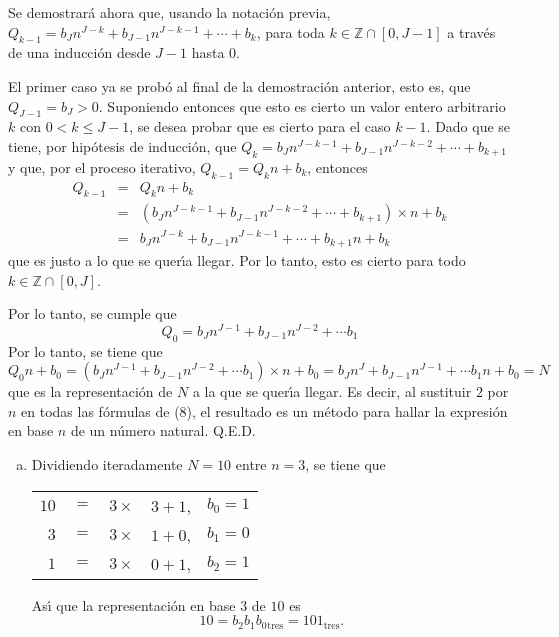 \begin{solucion}
 \par 
 Se demostrar\'a ahora que, usando la notaci\'on previa, $Q_{k-1} = b_{J}n^{J-k} + b_{J-1}n^{J-k-1} + \cdots + b_{k}$, para toda $k \in \mathbb{Z}\cap[0,J-1]$ a trav\'es de una inducci\'on desde $J-1$ hasta $0$.
 \par 
 El primer caso ya se prob\'o al final de la demostraci\'on anterior, esto es, que $Q_{J-1} = b_J > 0$. Suponiendo entonces que esto es cierto un valor entero arbitrario $k$ con $0 < k \leq J-1$, se desea probar que es cierto para el caso $k-1$.
 Dado que se tiene, por hip\'otesis de inducci\'on, que $Q_{k} = b_{J}n^{J-k-1} + b_{J-1}n^{J-k-2} + \cdots + b_{k+1}$ y que, por el proceso iterativo, $Q_{k-1} = Q_{k}n + b_{k}$, entonces 
 \begin{eqnarray*}
  Q_{k-1} & = & Q_{k}n + b_{k} \\
  & = & \left( b_{J}n^{J-k-1} + b_{J-1}n^{J-k-2} + \cdots + b_{k+1} \right) \times n + b_{k} \\
  & = & b_{J}n^{J-k} + b_{J-1}n^{J-k-1} + \cdots + b_{k+1}n + b_{k}
 \end{eqnarray*}
 que es justo a lo que se quer\'{\i}a llegar. Por lo tanto, esto es cierto para todo $k \in \mathbb{Z}\cap[0,J]$.
 \par 
 Por lo tanto, se cumple que
 \begin{equation*}
  Q_0 = b_Jn^{J-1} + b_{J-1}n^{J-2} + \cdots b_1
 \end{equation*}
 Por lo tanto, se tiene que
 \begin{equation*}
  Q_0n + b_0 = \left( b_Jn^{J-1} + b_{J-1}n^{J-2} + \cdots b_1 \right)\times n + b_0 = b_Jn^{J} + b_{J-1}n^{J-1} + \cdots b_1n + b_0 = N
 \end{equation*}
 que es la representaci\'on de $N$ a la que se quer\'{\i}a llegar. Es decir, al sustituir $2$ por $n$ en todas las f\'ormulas de (8), el resultado es un m\'etodo para hallar la expresi\'on en base $n$ de un n\'umero natural. Q.E.D.
 \begin{enumerate}[(a)]
  \item Dividiendo iteradamente $N=10$ entre $n=3$, se tiene que
  \begin{center}
   \begin{tabular}{rclrr}
    $10$ & $=$ & $3\times$ & $3+1$, & $b_0 = 1$ \\
    $3$ & $=$ & $3\times$ & $1 +0$, & $b_1 = 0$ \\
    $1$  & $=$ & $3\times$ & $0 +1$, & $b_2 = 1$
   \end{tabular}
  \end{center}
  As\'{\i} que la representaci\'on en base $3$ de $10$ es
  \begin{equation*}
   10 = b_2 b_1 b_{0}{}_{\text{tres}} = 101_{\text{tres}}.
  \end{equation*}


\end{enumerate}
\end{solucion}

